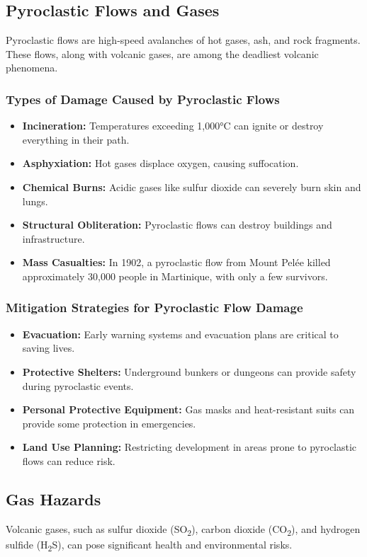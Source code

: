 \documentclass{article}
\begin{document}
\subsection{Pyroclastic Flows and Gases}
Pyroclastic flows are high-speed avalanches of hot gases, ash, and rock fragments. These flows, along with volcanic gases, are among the deadliest volcanic phenomena.

\subsubsection{Types of Damage Caused by Pyroclastic Flows}
\begin{itemize}
    \item \textbf{Incineration:} Temperatures exceeding 1,000°C can ignite or destroy everything in their path.
    \item \textbf{Asphyxiation:} Hot gases displace oxygen, causing suffocation.
    \item \textbf{Chemical Burns:} Acidic gases like sulfur dioxide can severely burn skin and lungs.
    \item \textbf{Structural Obliteration:} Pyroclastic flows can destroy buildings and infrastructure.
    \item \textbf{Mass Casualties:} In 1902, a pyroclastic flow from Mount Pelée killed approximately 30,000 people in Martinique, with only a few survivors.
\end{itemize}

\subsubsection{Mitigation Strategies for Pyroclastic Flow Damage}
\begin{itemize}
    \item \textbf{Evacuation:} Early warning systems and evacuation plans are critical to saving lives.
    \item \textbf{Protective Shelters:} Underground bunkers or dungeons can provide safety during pyroclastic events.
    \item \textbf{Personal Protective Equipment:} Gas masks and heat-resistant suits can provide some protection in emergencies.
    \item \textbf{Land Use Planning:} Restricting development in areas prone to pyroclastic flows can reduce risk.
\end{itemize}

\subsection{Gas Hazards}
Volcanic gases, such as sulfur dioxide (SO\textsubscript{2}), carbon dioxide (CO\textsubscript{2}), and hydrogen sulfide (H\textsubscript{2}S), can pose significant health and environmental risks.
\end{document}
